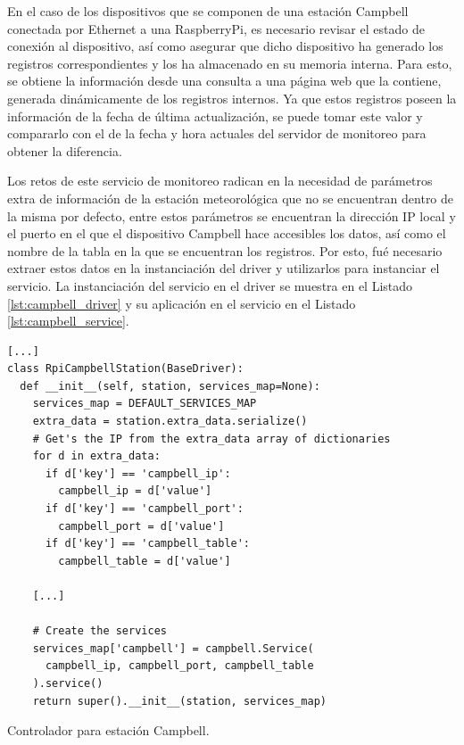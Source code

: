 En el caso de los dispositivos que se componen de una estación Campbell conectada por Ethernet a una RaspberryPi, es necesario revisar el estado de conexión al dispositivo, así como asegurar que dicho dispositivo ha generado los registros correspondientes y los ha almacenado en su memoria interna. Para esto, se obtiene la información desde una consulta a una página web que la contiene, generada dinámicamente de los registros internos. Ya que estos registros poseen la información de la fecha de última actualización, se puede tomar este valor y compararlo con el de la fecha y hora actuales del servidor de monitoreo para obtener la diferencia.

Los retos de este servicio de monitoreo radican en la necesidad de parámetros extra de información de la estación meteorológica que no se encuentran dentro de la misma por defecto, entre estos parámetros se encuentran la dirección IP local y el puerto en el que el dispositivo Campbell hace accesibles los datos, así como el nombre de la tabla en la que se encuentran los registros. Por esto, fué necesario extraer estos datos en la instanciación del driver y utilizarlos para instanciar el servicio. La instanciación del servicio en el driver se muestra en el Listado \ref{lst:campbell_driver} y su aplicación en el servicio en el Listado \ref{lst:campbell_service}.

\begin{listing}
\begin{verbatim}
[...]
class RpiCampbellStation(BaseDriver):
  def __init__(self, station, services_map=None):
    services_map = DEFAULT_SERVICES_MAP
    extra_data = station.extra_data.serialize()
    # Get's the IP from the extra_data array of dictionaries
    for d in extra_data:
      if d['key'] == 'campbell_ip':
        campbell_ip = d['value']
      if d['key'] == 'campbell_port':
        campbell_port = d['value']
      if d['key'] == 'campbell_table':
        campbell_table = d['value']

    [...]

    # Create the services
    services_map['campbell'] = campbell.Service(
      campbell_ip, campbell_port, campbell_table
    ).service()
    return super().__init__(station, services_map)
\end{verbatim}
\caption{Controlador para estación Campbell.}
\label{lst:campbell_driver}
\end{listing}


